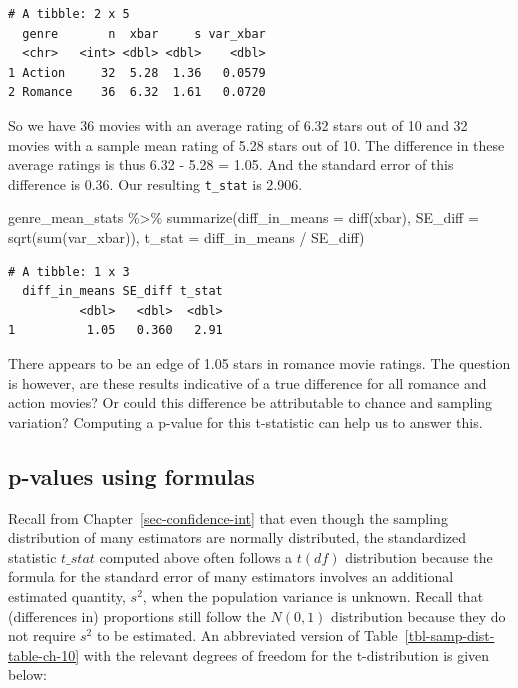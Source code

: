 \documentclass[
  letterpaper,
  DIV=11,
  numbers=noendperiod]{scrreprt}
\newenvironment{Shaded}{\begin{snugshade}}{\end{snugshade}}
\newcommand{\AttributeTok}[1]{\textcolor[rgb]{0.40,0.45,0.13}{#1}}
\newcommand{\FunctionTok}[1]{\textcolor[rgb]{0.28,0.35,0.67}{#1}}
\newcommand{\NormalTok}[1]{\textcolor[rgb]{0.00,0.23,0.31}{#1}}
\newcommand{\SpecialCharTok}[1]{\textcolor[rgb]{0.37,0.37,0.37}{#1}}
\theoremstyle{definition}
\theoremstyle{remark}
\begin{document}
\begin{verbatim}
# A tibble: 2 x 5
  genre       n  xbar     s var_xbar
  <chr>   <int> <dbl> <dbl>    <dbl>
1 Action     32  5.28  1.36   0.0579
2 Romance    36  6.32  1.61   0.0720
\end{verbatim}

So we have 36 movies with an average rating of 6.32 stars out of 10 and
32 movies with a sample mean rating of 5.28 stars out of 10. The
difference in these average ratings is thus 6.32 - 5.28 = 1.05. And the
standard error of this difference is 0.36. Our resulting
\texttt{t\_stat} is 2.906.

\begin{Shaded}
\begin{Highlighting}[]
\NormalTok{genre\_mean\_stats }\SpecialCharTok{\%\textgreater{}\%} 
  \FunctionTok{summarize}\NormalTok{(}\AttributeTok{diff\_in\_means =} \FunctionTok{diff}\NormalTok{(xbar),}
            \AttributeTok{SE\_diff =} \FunctionTok{sqrt}\NormalTok{(}\FunctionTok{sum}\NormalTok{(var\_xbar)),}
            \AttributeTok{t\_stat =}\NormalTok{ diff\_in\_means }\SpecialCharTok{/}\NormalTok{ SE\_diff) }
\end{Highlighting}
\end{Shaded}

\begin{verbatim}
# A tibble: 1 x 3
  diff_in_means SE_diff t_stat
          <dbl>   <dbl>  <dbl>
1          1.05   0.360   2.91
\end{verbatim}

There appears to be an edge of 1.05 stars in romance movie ratings. The
question is however, are these results indicative of a true difference
for all romance and action movies? Or could this difference be
attributable to chance and sampling variation? Computing a p-value for
this t-statistic can help us to answer this.

\hypertarget{p-values-using-formulas}{%
\subsection{p-values using formulas}\label{p-values-using-formulas}}

Recall from Chapter~\ref{sec-confidence-int} that even though the
sampling distribution of many estimators are normally distributed, the
standardized statistic \(t\_stat\) computed above often follows a
\(t(df)\) distribution because the formula for the standard error of
many estimators involves an additional estimated quantity, \(s^2\), when
the population variance is unknown. Recall that (differences in)
proportions still follow the \(N(0,1)\) distribution because they do not
require \(s^2\) to be estimated. An abbreviated version of
Table~\ref{tbl-samp-dist-table-ch-10} with the relevant degrees of
freedom for the t-distribution is given below:
\end{document}
